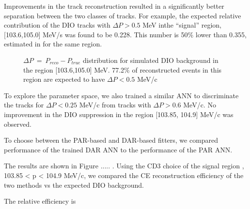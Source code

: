 Improvements in the track reconstruction resulted in a significantly better separation
between the two classes of tracks. For example, the expected relative contribution of
the DIO tracks with $\Delta{P} > 0.5$ MeV inthe ``signal'' region, [103.6,105.0] MeV/s was
found to be 0.228. This number is 50\% lower than 0.355, estimated in \cite{MU2E_4595_ANN_TRAINING}
for the same region.
\begin{figure}
\caption{
  \label{fig:sindrum_ii_fig_08_fit} 
  $\Delta P ~=~ P_{reco} -P_{true}$ distribution for simulated DIO background in the region [103.6,105.0] MeV.
  77.2\% of reconstructed events in this region are expected to have $\Delta P < 0.5$ MeV/c
}
\end{figure}

To explore the parameter space, we also trained a similar ANN to discriminate the tracks for
$\Delta{P} < 0.25$ MeV/c from tracks with $\Delta{P} > 0.6$ MeV/c. No improvement in the DIO
suppression in the region [103.85, 104.9] MeV/c was observed. 

To choose between the PAR-based and DAR-based fitters, we compared performance of the
trained DAR ANN to the performance of the PAR ANN.

The results are shown in Figure ..... .
Using the CD3 choice of the signal region , 103.85 < p < 104.9 MeV/c, we compared the
CE reconstruction efficiency of the two methods vs the expected DIO background.

The relative efficiency is 